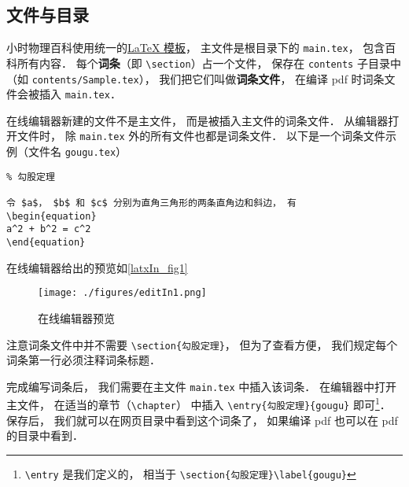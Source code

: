 

\subsection{文件与目录}

小时物理百科使用统一的\href{https://github.com/MacroUniverse/PhysWiki}{LaTeX 模板}， 主文件是根目录下的 \lstinline|main.tex|， 包含百科所有内容． 每个\textbf{词条}（即 \lstinline|\section|）占一个文件， 保存在 \lstinline|contents| 子目录中 （如 \lstinline|contents/Sample.tex|）， 我们把它们叫做\textbf{词条文件}， 在编译 pdf 时词条文件会被插入 \lstinline|main.tex|．

在线编辑器新建的文件不是主文件， 而是被插入主文件的词条文件． 从编辑器打开文件时， 除 \lstinline|main.tex| 外的所有文件也都是词条文件． 以下是一个词条文件示例（文件名 \lstinline|gougu.tex|）

\begin{lstlisting}
% 勾股定理

令 $a$， $b$ 和 $c$ 分别为直角三角形的两条直角边和斜边， 有
\begin{equation}
a^2 + b^2 = c^2
\end{equation}
\end{lstlisting}
在线编辑器给出的预览如\autoref{latxIn_fig1}
\begin{figure}[ht]
\centering
\texttt{[image: ./figures/editIn1.png]}
\caption{在线编辑器预览} \label{editIn_fig1}
\end{figure}

注意词条文件中并不需要 \lstinline|\section{勾股定理}|， 但为了查看方便， 我们规定每个词条第一行必须注释词条标题．

完成编写词条后， 我们需要在主文件 \lstinline|main.tex| 中插入该词条． 在编辑器中打开主文件， 在适当的章节（\lstinline|\chapter|） 中插入 \lstinline|\entry{勾股定理}{gougu}| 即可\footnote{\lstinline|\entry| 是我们定义的， 相当于 \lstinline|\section{勾股定理}\label{gougu}|}． 保存后， 我们就可以在网页目录中看到这个词条了， 如果编译 pdf 也可以在 pdf 的目录中看到．
